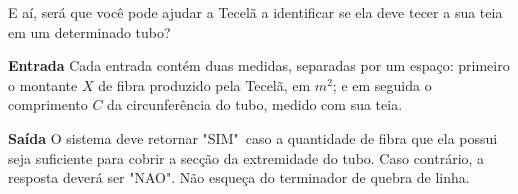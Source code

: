	
	E aí, será que você pode ajudar a Tecelã a identificar se ela deve tecer a sua teia em um determinado tubo?

\vspace{0.3cm}
\textbf{Entrada}
Cada entrada contém duas medidas, separadas por um espaço: primeiro o montante $X$ de fibra produzido pela Tecelã, em $m^2$; e em seguida o comprimento $C$ da circunferência do tubo, medido com sua teia.


\vspace{0.3cm}
\textbf{Saída}
O sistema deve retornar "SIM"\ caso a quantidade de fibra que ela possui seja suficiente para cobrir a secção da extremidade do tubo. Caso contrário, a resposta deverá ser "NAO". Não esqueça do terminador de quebra de linha.


